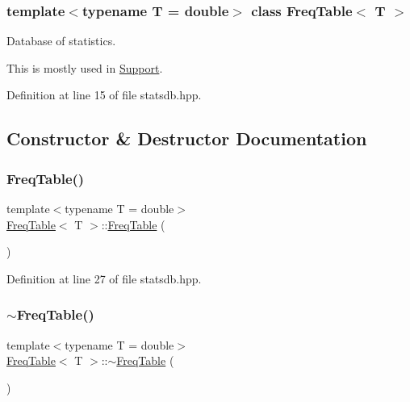 \subsubsection*{template$<$typename T = double$>$\newline
class Freq\+Table$<$ T $>$}

Database of statistics. 

This is mostly used in {\ttfamily \hyperlink{class_support}{Support}}. 

Definition at line 15 of file statsdb.\+hpp.



\subsection{Constructor \& Destructor Documentation}
\mbox{\label{class_freq_table_a2fdea53e35f9a301d7d1bbf6b7da5f41}} 
\subsubsection{\texorpdfstring{Freq\+Table()}{FreqTable()}}
{\footnotesize\ttfamily template$<$typename T = double$>$ \\
\hyperlink{class_freq_table}{Freq\+Table}$<$ T $>$\+::\hyperlink{class_freq_table}{Freq\+Table} (\begin{DoxyParamCaption}{ }\end{DoxyParamCaption})\hspace{0.3cm}{\ttfamily [inline]}}



Definition at line 27 of file statsdb.\+hpp.

\mbox{\label{class_freq_table_a7ed627807a61c484243636137609abcd}} 
\subsubsection{\texorpdfstring{$\sim$\+Freq\+Table()}{~FreqTable()}}
{\footnotesize\ttfamily template$<$typename T = double$>$ \\
\hyperlink{class_freq_table}{Freq\+Table}$<$ T $>$\+::$\sim$\hyperlink{class_freq_table}{Freq\+Table} (\begin{DoxyParamCaption}{ }\end{DoxyParamCaption})\hspace{0.3cm}{\ttfamily [inline]}}



